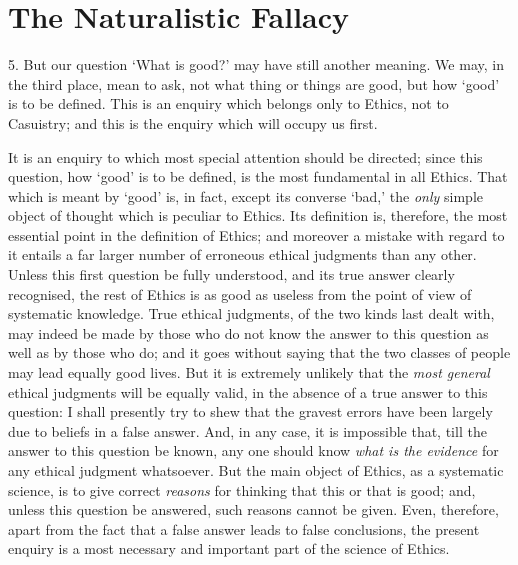 
\author{G. E. Moore}
\chapter{The Naturalistic Fallacy}



5. But our question `What is good?' may have still another
meaning. We may, in the third place, mean to ask, not what thing or
things are good, but how `good' is to be defined. This is an enquiry
which belongs only to Ethics, not to Casuistry; and this is the
enquiry which will occupy us first.

It is an enquiry to which most special attention should be directed;
since this question, how `good' is to be defined, is the most
fundamental in all Ethics. That which is meant by `good' is, in fact,
except its converse `bad,' the \textit{only} simple object of thought
which is peculiar to Ethics. Its definition is, therefore, the most
essential point in the definition of Ethics; and moreover a mistake
with regard to it entails a far larger number of erroneous ethical
judgments than any other. Unless this first question be fully
understood, and its true answer clearly recognised, the rest of Ethics
is as good as useless from the point of view of systematic knowledge.
True ethical judgments, of the two kinds last dealt with, may indeed
be made by those who do not know the answer to this question as well
as by those who do; and it goes without saying that the two classes of
people may lead equally good lives. But it is extremely unlikely that
the \textit{most general} ethical judgments will be equally valid, in
the absence of a true answer to this question: I shall presently try
to shew that the gravest errors have been largely due to 
beliefs in a false answer. And, in any case, it is impossible that,
till the answer to this question be known, any one should know
\textit{what is the evidence} for any ethical judgment whatsoever. But
the main object of Ethics, as a systematic science, is to give correct
\textit{reasons} for thinking that this or that is good; and, unless
this question be answered, such reasons cannot be given. Even,
therefore, apart from the fact that a false answer leads to false
conclusions, the present enquiry is a most necessary and important
part of the science of Ethics.

